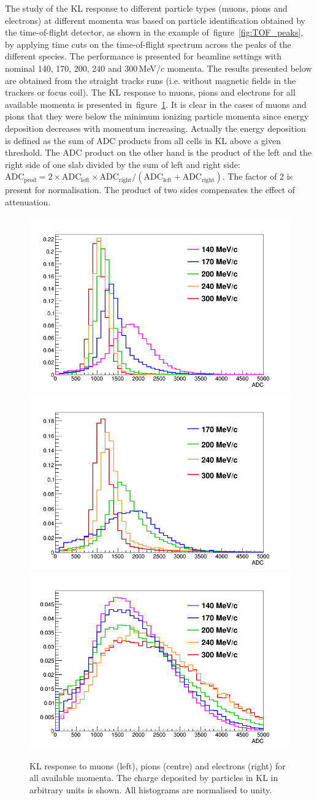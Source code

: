 The study of the KL response to different particle types (muons, pions and electrons) at different momenta was based on particle identification obtained by the time-of-flight detector, as shown in the example of~figure~\ref{fig:TOF_peaks}, by applying time cuts on the time-of-flight spectrum across the peaks of the different species. The performance is presented for beamline settings with nominal 140, 170, 200, 240 and 300\,MeV/$c$ momenta. The results presented below are obtained from the straight tracks runs (i.e. without magnetic fields in the trackers or focus coil). The KL response to muons, pions and electrons for all available momenta is presented in~figure~\ref{fig:KL3}. It is clear in the cases of muons and pions that they were below the minimum ionizing particle momenta since energy deposition decreases with momentum increasing. Actually the energy deposition is defined as the sum of ADC products from all cells in KL above a given threshold. The ADC product on the other hand is the product of the left and the right side of one slab divided by the sum of left and right side: $\text{ADC}_{\text{prod}} = 2 \times \text{ADC}_{\text{left}} \times \text{ADC}_{\text{right}} / (\text{ADC}_{\text{left}} + \text{ADC}_{\text{right}})$. The factor of 2 is present for normalisation. The product of two sides compensates the effect of attenuation.
  \begin{figure}
	\begin{center}
  		\includegraphics[width=0.32\columnwidth]{./04-KL/Figures/muon.png}
  		\includegraphics[width=0.32\columnwidth]{./04-KL/Figures/pion.png}
  		\includegraphics[width=0.32\columnwidth]{./04-KL/Figures/electron.png}
  		\caption{KL response to muons (left), pions (centre) and electrons (right) for all available momenta. The charge deposited by particles in KL in arbitrary units is shown. All histograms are normalised to unity.}
  		\label{fig:KL3}
  	\end{center}
  \end{figure}
  
